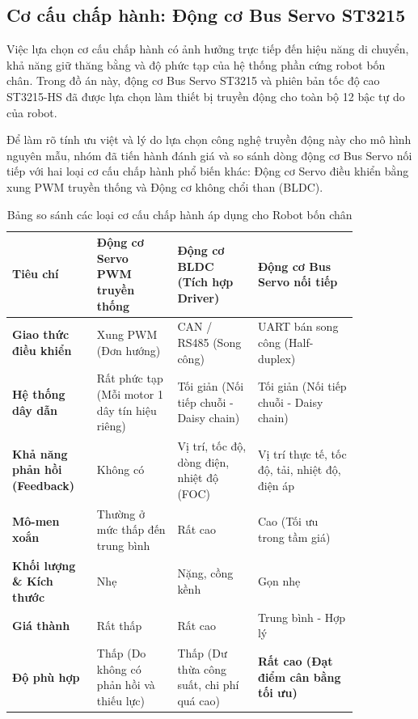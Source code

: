 \subsection{Cơ cấu chấp hành: Động cơ Bus Servo ST3215}

Việc lựa chọn cơ cấu chấp hành có ảnh hưởng trực tiếp đến hiệu năng di chuyển, khả năng giữ thăng bằng và độ phức tạp của hệ thống phần cứng robot bốn chân. Trong đồ án này, động cơ Bus Servo ST3215 và phiên bản tốc độ cao ST3215-HS \cite{waveshare_st3215} đã được lựa chọn làm thiết bị truyền động cho toàn bộ 12 bậc tự do của robot. 

Để làm rõ tính ưu việt và lý do lựa chọn công nghệ truyền động này cho mô hình nguyên mẫu, nhóm đã tiến hành đánh giá và so sánh dòng động cơ Bus Servo nối tiếp với hai loại cơ cấu chấp hành phổ biến khác: Động cơ Servo điều khiển bằng xung PWM truyền thống và Động cơ không chổi than (BLDC).

\begin{table}[H]
\centering
\caption{Bảng so sánh các loại cơ cấu chấp hành áp dụng cho Robot bốn chân}
\label{tab:motor_comparison}
\renewcommand{\arraystretch}{1.3}
\begin{tabular}{|p{0.2\linewidth}|p{0.2\linewidth}|p{0.2\linewidth}|p{0.25\linewidth}|}
\hline
\textbf{Tiêu chí} & \textbf{Động cơ Servo PWM truyền thống} & \textbf{Động cơ BLDC (Tích hợp Driver)} & \textbf{Động cơ Bus Servo nối tiếp} \\ \hline
\textbf{Giao thức điều khiển} & Xung PWM (Đơn hướng) & CAN / RS485 (Song công) & UART bán song công (Half-duplex) \\ \hline
\textbf{Hệ thống dây dẫn} & Rất phức tạp (Mỗi motor 1 dây tín hiệu riêng) & Tối giản (Nối tiếp chuỗi - Daisy chain) & Tối giản (Nối tiếp chuỗi - Daisy chain) \\ \hline
\textbf{Khả năng phản hồi (Feedback)} & Không có & Vị trí, tốc độ, dòng điện, nhiệt độ (FOC) & Vị trí thực tế, tốc độ, tải, nhiệt độ, điện áp \\ \hline
\textbf{Mô-men xoắn} & Thường ở mức thấp đến trung bình & Rất cao & Cao (Tối ưu trong tầm giá) \\ \hline
\textbf{Khối lượng \& Kích thước} & Nhẹ & Nặng, cồng kềnh & Gọn nhẹ \\ \hline
\textbf{Giá thành} & Rất thấp & Rất cao & Trung bình - Hợp lý \\ \hline
\textbf{Độ phù hợp} & Thấp (Do không có phản hồi và thiếu lực) & Thấp (Dư thừa công suất, chi phí quá cao) & \textbf{Rất cao (Đạt điểm cân bằng tối ưu)} \\ \hline
\end{tabular}
\end{table}

